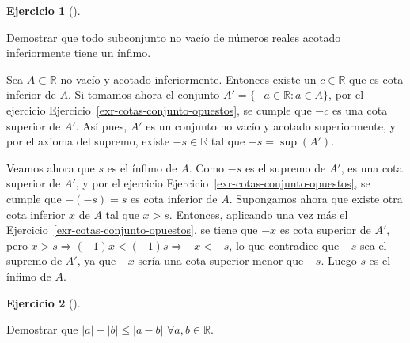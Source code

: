 \documentclass[
  a4paper,
]{scrreport}
\theoremstyle{definition}
\newtheorem{exercise}{Ejercicio}[chapter]
\theoremstyle{remark}
\begin{document}
\leavevmode{}%
\begin{exercise}[]\label{exr-propiedad-infimo}

Demostrar que todo subconjunto no vacío de números reales acotado
inferiormente tiene un ínfimo.

\end{exercise}

\begin{tcolorbox}[enhanced jigsaw, breakable, title=\textcolor{quarto-callout-tip-color}{\faLightbulb}\hspace{0.5em}{Solución}, left=2mm, leftrule=.75mm, colback=white, bottomtitle=1mm, coltitle=black, bottomrule=.15mm, colframe=quarto-callout-tip-color-frame, colbacktitle=quarto-callout-tip-color!10!white, rightrule=.15mm, opacitybacktitle=0.6, arc=.35mm, toprule=.15mm, opacityback=0, toptitle=1mm, titlerule=0mm]
Sea \(A\subset\mathbb{R}\) no vacío y acotado inferiormente. Entonces
existe un \(c\in\mathbb{R}\) que es cota inferior de \(A\). Si tomamos
ahora el conjunto \(A'=\{-a\in\mathbb{R}: a\in A\}\), por el ejercicio
Ejercicio~\ref{exr-cotas-conjunto-opuestos}, se cumple que \(-c\) es una
cota superior de \(A'\). Así pues, \(A'\) es un conjunto no vacío y
acotado superiormente, y por el axioma del supremo, existe
\(-s\in\mathbb{R}\) tal que \(-s=\sup(A')\).

Veamos ahora que \(s\) es el ínfimo de \(A\). Como \(-s\) es el supremo
de \(A'\), es una cota superior de \(A'\), y por el ejercicio
Ejercicio~\ref{exr-cotas-conjunto-opuestos}, se cumple que \(-(-s)=s\)
es cota inferior de \(A\). Supongamos ahora que existe otra cota
inferior \(x\) de \(A\) tal que \(x>s\). Entonces, aplicando una vez más
el Ejercicio~\ref{exr-cotas-conjunto-opuestos}, se tiene que \(-x\) es
cota superior de \(A'\), pero
\(x>s\Rightarrow (-1)x<(-1)s \Rightarrow -x<-s\), lo que contradice que
\(-s\) sea el supremo de \(A'\), ya que \(-x\) sería una cota superior
menor que \(-s\). Luego \(s\) es el ínfimo de \(A\).
\end{tcolorbox}

\leavevmode{}%
\begin{exercise}[]\label{exr-propiedad-valor-absoluto}

Demostrar que \(|a|-|b|\leq |a-b|\) \(\forall a,b\in\mathbb{R}\).

\end{exercise}
\end{document}
